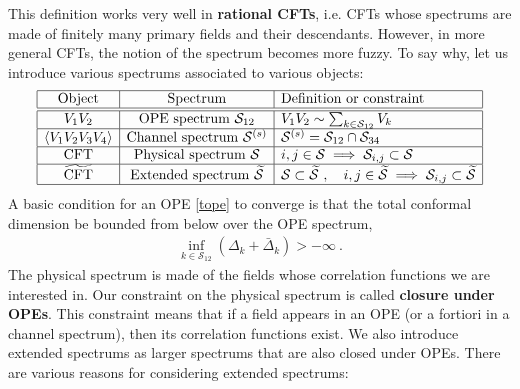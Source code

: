\documentclass[12pt, a4paper]{article}
\theoremstyle{break}
\begin{document}
This definition works very well in \textbf{rational CFTs}, i.e. CFTs whose spectrums are made of finitely many primary fields and their descendants. However, in more general CFTs, the notion of the spectrum becomes more fuzzy. To say why, let us introduce various spectrums associated to various objects:
\begin{align}
 \begin{array}{|c|c|l|}
  \hline 
  \text{Object} & \text{Spectrum}  & \text{Definition or constraint}
  \\
  \hline \hline 
  V_1V_2 & \text{OPE spectrum } \mathcal{S}_{12} & V_1V_2 \sim \sum_{k\in \mathcal{S}_{12}} V_k 
  \\
  \hline 
  \left<V_1V_2V_3V_4\right> & \text{Channel spectrum } \mathcal{S}^{(s)} &  \mathcal{S}^{(s)}= \mathcal{S}_{12}\cap \mathcal{S}_{34}
  \\
  \hline 
  \text{CFT} & \text{Physical spectrum } \mathcal{S} &  i,j\in\mathcal{S}\implies \mathcal{S}_{i,j}\subset \mathcal{S}  
  \\
  \hline 
  \widetilde{\text{CFT}} & \text{Extended spectrum } \widetilde{\mathcal{S}} & \mathcal{S}\subset \widetilde{\mathcal{S}}\ , \quad i,j\in\widetilde{\mathcal{S}}\implies \mathcal{S}_{i,j}\subset \widetilde{\mathcal{S}}
  \\
  \hline 
 \end{array}
 \label{specs}
\end{align}
A basic condition for an OPE \eqref{tope} to converge is that the total conformal dimension be bounded from below over the OPE spectrum,
\begin{align}
 \boxed{\inf_{k\in \mathcal{S}_{12}}\left(\Delta_k+\bar\Delta_k\right) > -\infty} \ . 
\end{align}
The physical spectrum is made of the fields whose correlation functions we are interested in. Our constraint on the physical spectrum is called \textbf{closure under OPEs}. This constraint means that if a field appears in an OPE (or a fortiori in a channel spectrum), then its correlation functions exist. 
We also introduce extended spectrums as larger spectrums that are also closed under OPEs. There are various reasons for considering extended spectrums:
\end{document}
